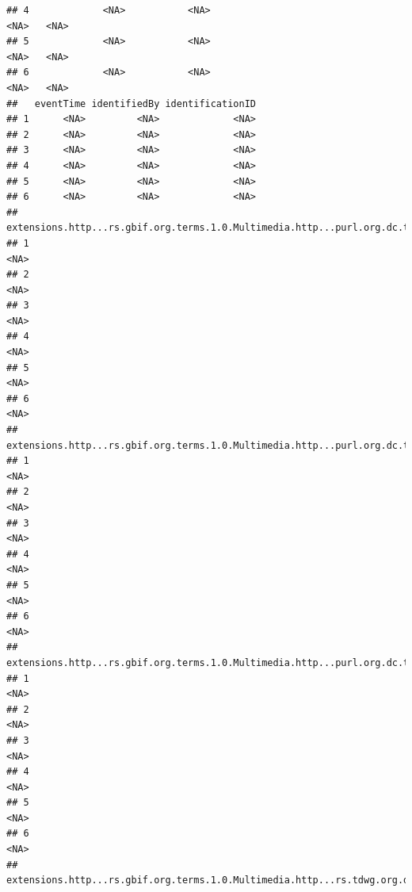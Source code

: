 \documentclass[
]{book}
\begin{document}
\begin{verbatim}
## 4             <NA>           <NA>                                 <NA>   <NA>
## 5             <NA>           <NA>                                 <NA>   <NA>
## 6             <NA>           <NA>                                 <NA>   <NA>
##   eventTime identifiedBy identificationID
## 1      <NA>         <NA>             <NA>
## 2      <NA>         <NA>             <NA>
## 3      <NA>         <NA>             <NA>
## 4      <NA>         <NA>             <NA>
## 5      <NA>         <NA>             <NA>
## 6      <NA>         <NA>             <NA>
##   extensions.http...rs.gbif.org.terms.1.0.Multimedia.http...purl.org.dc.terms.rightsHolder.6
## 1                                                                                       <NA>
## 2                                                                                       <NA>
## 3                                                                                       <NA>
## 4                                                                                       <NA>
## 5                                                                                       <NA>
## 6                                                                                       <NA>
##   extensions.http...rs.gbif.org.terms.1.0.Multimedia.http...purl.org.dc.terms.identifier.6
## 1                                                                                     <NA>
## 2                                                                                     <NA>
## 3                                                                                     <NA>
## 4                                                                                     <NA>
## 5                                                                                     <NA>
## 6                                                                                     <NA>
##   extensions.http...rs.gbif.org.terms.1.0.Multimedia.http...purl.org.dc.terms.type.6
## 1                                                                               <NA>
## 2                                                                               <NA>
## 3                                                                               <NA>
## 4                                                                               <NA>
## 5                                                                               <NA>
## 6                                                                               <NA>
##   extensions.http...rs.gbif.org.terms.1.0.Multimedia.http...rs.tdwg.org.dwc.terms.catalogNumber.6

\end{verbatim}
\end{document}
